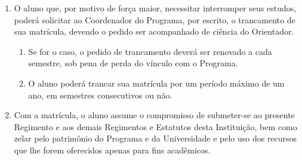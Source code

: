 \documentclass{article}
\begin{document}
\begin{enumerate}
	\item O aluno que, por motivo de força maior, necessitar interromper seus estudos, poderá solicitar ao Coordenador do Programa, por escrito, o trancamento de sua matrícula, devendo o pedido ser acompanhado de ciência do Orientador.
	\begin{enumerate}
		\item Se for o caso, o pedido de trancamento deverá ser renovado a cada semestre, sob pena de perda do vínculo com o Programa.
		\item O aluno poderá trancar sua matrícula por um período máximo de um ano, em semestres consecutivos ou não.
	\end{enumerate}

	\item Com a matrícula, o aluno assume o compromisso de submeter-se ao presente Regimento e aos demais Regimentos e Estatutos desta Instituição, bem como zelar pelo patrimônio do Programa e da Universidade e pelo uso dos recursos que lhe forem oferecidos apenas para fins acadêmicos.
\end{enumerate}
\end{document}

